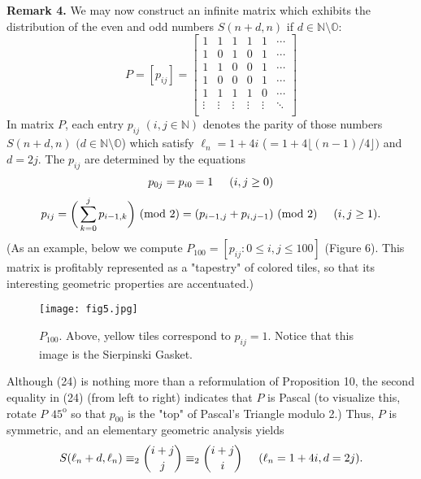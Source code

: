 \documentclass[]{amsart}
\begin{document}
\noindent
\textbf{Remark 4.}  We may now construct an infinite matrix which exhibits the distribution of the even and odd numbers $S(n+d,n)$ if $d \in \mathbb{N}\setminus\mathbb{O}$:
$$
P = [p_{ij}] =
\left[ \begin{array}{ccccccccccccccccc}
1 & 1 & 1 & 1 & 1 & \cdots \\
1 & 0 & 1 & 0 & 1 & \cdots \\
1 & 1 & 0 & 0 & 1 & \cdots \\
1 & 0 & 0 & 0 & 1 & \cdots \\
1 & 1 & 1 & 1 & 0 & \cdots \\
\vdots & \vdots & \vdots & \vdots & \vdots & \ddots \\
\end{array}\right]
$$
In matrix $P$, each entry $p_{ij}$ $(i,j \in \mathbb{N})$ denotes the parity of those numbers $S(n+d,n)$ $(d \in \mathbb{N}\setminus\mathbb{O}$) which satisfy $\ell_{n} = 1 + 4i$ ($= 1 + 4\lfloor (n-1)/4 \rfloor)$ and $d = 2j$. The $p_{ij}$ are determined by the equations
\begin{equation}
p_{0j} = p_{i0} = 1 \hspace{5mm} (i,j \geq 0)
\end{equation}
\begin{equation}
p_{ij} = \bigg(\sum_{k=0}^{j} p_{i-1,k}\bigg) \mbox{ (mod $2$)} = (p_{i-1,j} + p_{i,j-1}) \mbox{ (mod $2$)} \hspace{5mm} (i,j \geq 1).
\end{equation}
(As an example, below we compute $P_{100} = [p_{ij} : 0 \leq i,j \leq 100]$ (Figure 6).  This matrix is profitably represented as a "tapestry" of colored tiles, so that its interesting geometric properties are accentuated.)
\begin{figure}[H]
	\centering
	\texttt{[image: fig5.jpg]}
	\caption{$P_{100}$.  Above, yellow tiles correspond to $p_{ij} = 1$.  Notice that this image is the Sierpinski Gasket. }
\end{figure}
Although (24) is nothing more than a reformulation of Proposition 10, the second equality in (24) (from left to right) indicates that $P$ is Pascal (to visualize this, rotate $P$ $45^{\mathrm{o}}$ so that $p_{00}$ is the "top" of Pascal's Triangle modulo 2.)  Thus, $P$ is symmetric, and an elementary geometric analysis yields
\begin{equation}
S(\ell_{n}+d,\ell_{n}) \equiv_{2} {i+j \choose j} \equiv_{2} {i+j \choose i} \hspace{5mm} (\ell_{n} = 1+4i, d = 2j).
\end{equation}
\end{document}

